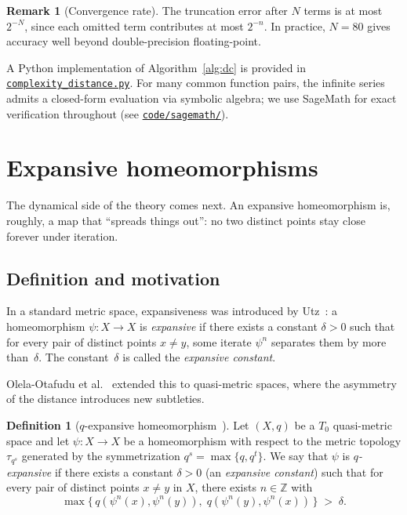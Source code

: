 \documentclass[11pt,a4paper]{article}
\newcommand{\repourl}{https://github.com/gabayae/expansive-homeomorphisms-complexity-qmetric}
\theoremstyle{plain}
\theoremstyle{definition}
\newtheorem{definitioninner}[theoreminner]{Definition}
\newtheorem{remarkinner}[theoreminner]{Remark}
\newenvironment{definition}[1][]{\begin{definitioninner}[#1]}{\end{definitioninner}}
\newenvironment{remark}[1][]{\begin{remarkinner}[#1]}{\end{remarkinner}}
\newcommand{\Z}{\mathbb{Z}}
\begin{document}
\begin{remark}[Convergence rate]
The truncation error after $N$ terms is at most $2^{-N}$, since each
omitted term contributes at most $2^{-n}$.  In practice, $N=80$ gives
accuracy well beyond double-precision floating-point.
\end{remark}

A Python implementation of Algorithm~\ref{alg:dc} is provided in
\href{\repourl/blob/main/code/python/complexity_distance.py}{\texttt{complexity\_distance.py}}.
For many common function pairs, the infinite series admits a
closed-form evaluation via symbolic algebra; we use SageMath for
exact verification throughout (see
\href{\repourl/tree/main/code/sagemath}{\texttt{code/sagemath/}}).


\section{Expansive homeomorphisms}
\label{sec:expansive}

The dynamical side of the theory comes next.  An expansive
homeomorphism is, roughly, a map that ``spreads things out'': no
two distinct points stay close forever under iteration.

\subsection{Definition and motivation}

In a standard metric space, expansiveness was introduced by
Utz~\cite{utz1950}: a homeomorphism $\psi\colon X\to X$ is
\emph{expansive} if there exists a constant $\delta>0$ such that for
every pair of distinct points $x\neq y$, some iterate $\psi^n$
separates them by more than~$\delta$.  The constant~$\delta$ is
called the \emph{expansive constant}.

Olela-Otafudu et al.~\cite{olela2024} extended this to
quasi-metric spaces, where the asymmetry of the distance introduces
new subtleties.

\begin{definition}[$q$-expansive homeomorphism~{\cite{olela2024}}]
\label{def:expansive}
Let $(X,q)$ be a $T_0$ quasi-metric space and let
$\psi\colon X\to X$ be a homeomorphism with respect to the
metric topology $\tau_{q^s}$ generated by the symmetrization
$q^s=\max\{q,q^t\}$.  We say that $\psi$ is \emph{$q$-expansive} if
there exists a constant $\delta>0$ (an \emph{expansive constant})
such that for every pair of distinct points $x\ne y$ in $X$, there
exists $n\in\Z$ with
\[
  \max\{\,q(\psi^n(x),\psi^n(y)),\;q(\psi^n(y),\psi^n(x))\,\}
  \;>\;\delta.
\]
\end{definition}
\end{document}
